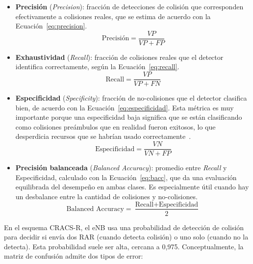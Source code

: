 \begin{itemize}
    \item \textbf{Precisión} (\textit{Precision}): fracción de detecciones de colisión que
          corresponden efectivamente a colisiones reales, que se estima de acuerdo con la
          Ecuación~\ref{eq:precision}.
          \begin{equation}
          \text{Precisión} = \frac{VP}{VP + FP}
          \label{eq:precision}
          \end{equation}

    \item \textbf{Exhaustividad} (\textit{Recall}): fracción de colisiones reales que el
          detector identifica correctamente, según la Ecuación~\ref{eq:recall}.
          \begin{equation}
          \text{Recall} = \frac{VP}{VP + FN}
          \label{eq:recall}
          \end{equation}

    \item \textbf{Especificidad} (\textit{Specificity}): fracción de no-colisiones que el
          detector clasifica bien, de acuerdo con la Ecuación~\ref{eq:especificidad}. Esta
          métrica es muy importante porque una especificidad baja significa que se están
          clasificando como colisiones preámbulos que en realidad fueron exitosos, lo que
          desperdicia recursos que se habrían usado correctamente~\cite{ref11}.
          \begin{equation}
          \text{Especificidad} = \frac{VN}{VN + FP}
          \label{eq:especificidad}
          \end{equation}

    \item \textbf{Precisión balanceada} (\textit{Balanced Accuracy}): promedio entre
          \textit{Recall} y Especificidad, calculado con la Ecuación~\ref{eq:bacc}, que da una
          evaluación equilibrada del desempeño en ambas clases. Es especialmente útil cuando
          hay un desbalance entre la cantidad de colisiones y no-colisiones.
          \begin{equation}
          \text{Balanced Accuracy} = \frac{\text{Recall} + \text{Especificidad}}{2}
          \label{eq:bacc}
          \end{equation}
\end{itemize}

En el esquema CRACS-R, el eNB usa una probabilidad de detección de colisión para
decidir si envía dos RAR (cuando detecta colisión) o uno solo (cuando no la detecta). Esta
probabilidad suele ser alta, cercana a 0{,}975. Conceptualmente, la matriz de
confusión admite dos tipos de error:

